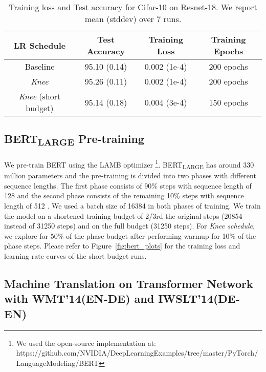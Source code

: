 \documentclass{article} \usepackage{iclr2021_conference,times}
\newcommand{\lrschedule}{\textit{Knee schedule}}
\newcommand{\lrscheduleshort}{\textit{Knee}}
\begin{document}
\begin{table}[h]
    \small
\centering
\caption{Training loss and Test accuracy for Cifar-10 on Resnet-18. We report mean (stddev) over 7 runs.} 
\label{tab:cifar_results_train_loss_test_acc}
\begin{tabular}{cccc}
\toprule
\multirow{1}{*}{LR Schedule} & Test Accuracy & Training Loss & Training Epochs \\
\midrule
  Baseline   & \multirow{1}{*}{95.10 (0.14)}  & \multirow{1}{*}{0.002 (1e-4)}  & 200 epochs \\ 

  \lrscheduleshort{}     & \multirow{1}{*}{95.26 (0.11)} &  \multirow{1}{*}{0.002 (1e-4)} & 200 epochs \\
   
  
  \lrscheduleshort{} (short budget)     & \multirow{1}{*}{95.14 (0.18)} &  \multirow{1}{*}{0.004 (3e-4)}  & 150 epochs \\  
\bottomrule
\end{tabular}
\end{table}

\subsection{BERT\textsubscript{LARGE} Pre-training}
We pre-train BERT using the LAMB optimizer
\footnote{We used the open-source implementation at: \\https://github.com/NVIDIA/DeepLearningExamples/tree/master/PyTorch/LanguageModeling/BERT}. BERT\textsubscript{LARGE} has around 330 million parameters and the pre-training is divided into two phases with different sequence lengths. The first phase consists of 90\% steps with sequence length of 128 and the second phase consists of the remaining 10\% steps with sequence length of 512 \cite{devlin2018bert}. We used a batch size of 16384 in both phases of training. We train the model on a shortened training budget of 2/3rd the original steps (20854 instead of 31250 steps) and on the full budget (31250 steps). For \lrschedule{}, we explore for 50\% of the phase budget after performing warmup for 10\% of the phase steps. Please refer to Figure~\ref{fig:bert_plots} for the training loss and learning rate curves of the short budget runs.

\subsection{Machine Translation on Transformer Network with WMT’14(EN-DE) and IWSLT'14(DE-EN)}
\end{document}
